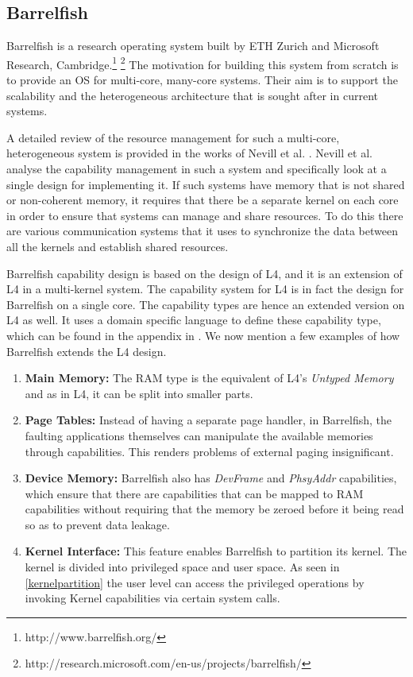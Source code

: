 \subsection{Barrelfish}
\label{subsec:Barrelfish}
Barrelfish is a research operating system built by ETH Zurich and Microsoft Research, Cambridge.\footnote{http://www.barrelfish.org/} \footnote{http://research.microsoft.com/en-us/projects/barrelfish/} The motivation for building this system from scratch is to provide an OS for multi-core, many-core systems. Their aim is to support the scalability and the heterogeneous architecture that is sought after in current systems. 

A detailed review of the resource management for such a multi-core, heterogeneous system is provided in the works of Nevill et al. \cite{nevillmasters}. Nevill et al. analyse the capability management in such a system and specifically look at a single design for implementing it. If such systems have memory that is not shared or non-coherent memory, it requires that there be a separate kernel on each core in order to ensure that systems can manage and share resources. To do this there are various communication systems that it uses to synchronize the data between all the kernels and establish shared resources. 

Barrelfish capability design is based on the design of L4, and it is an extension of L4 in a multi-kernel system. The capability system for L4 is in fact the design for Barrelfish on a single core. The capability types are hence an extended version on L4 as well. It uses a domain specific language to define these capability type, which can be found in the appendix in \cite{nevillmasters}. We now mention a few examples of how Barrelfish extends the L4 design.

\begin{enumerate}
\item \textbf{Main Memory:} The RAM type is the equivalent of L4's \textit{Untyped Memory} and as in L4, it can be split into smaller parts.
\item \textbf{Page Tables:} Instead of having a separate page handler, in Barrelfish, the faulting applications themselves can manipulate the available memories through capabilities. This renders problems of external paging insignificant.
\item \textbf{Device Memory:} Barrelfish also has \textit{DevFrame} and \textit{PhsyAddr} capabilities, which ensure that there are capabilities that can be mapped to RAM capabilities without requiring that the memory be zeroed before it being read so as to prevent data leakage.
\item \textbf{Kernel Interface:} This feature enables Barrelfish to partition its kernel. The kernel is divided into privileged space and user space. As seen in \ref{kernelpartition} the user level can access the privileged operations by invoking Kernel capabilities via certain system calls.
\end{enumerate}

